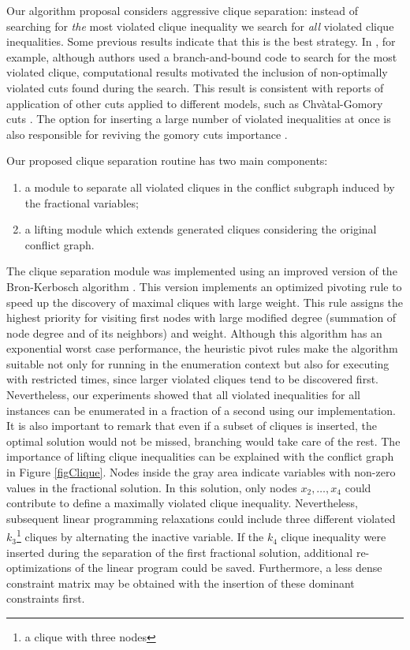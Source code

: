 \documentclass{endm}
\begin{document}
Our algorithm proposal considers aggressive clique separation: instead of searching for \emph{the} most violated clique inequality we search for \emph{all} violated clique inequalities. Some previous results indicate that this is the best strategy. In \cite{Marecek2012}, for example, although authors used a branch-and-bound code to search for the most violated clique, computational results motivated the inclusion of non-optimally violated cuts found during the search. This result is consistent with reports of application of other cuts applied to different models, such as {C}hv\`{a}tal-Gomory cuts \cite{Fischetti2007}. The option for inserting a large number of violated inequalities at once is also responsible for reviving the gomory cuts importance \cite {Cornuejols2007}.

Our proposed clique separation routine has two main components:  \begin{enumerate} \item a module to separate all violated cliques in the conflict subgraph induced by the fractional variables; \item a lifting module which extends generated cliques considering the original conflict graph. \end{enumerate}  The clique separation module was implemented using an improved version of the Bron-Kerbosch algorithm \cite{Bron1973}. This version implements an optimized pivoting rule \cite{Brito2011} to speed up the discovery of maximal cliques with large weight. This rule assigns the highest priority for visiting first nodes with large modified degree (summation of node degree and of its neighbors) and weight. Although this algorithm has an exponential worst case performance, the heuristic pivot rules  make the algorithm suitable not only for running in the enumeration context but also for executing with restricted times, since larger violated cliques tend to be discovered first. Nevertheless, our experiments showed that all violated inequalities for all instances can be enumerated in a fraction of a second using our implementation. It is also important to remark that even if a subset of cliques is inserted, the optimal solution would not be missed, branching would take care of the rest.  The importance of lifting clique inequalities can be explained with the conflict graph in Figure \ref{figClique}. Nodes inside the gray area indicate variables with non-zero values in the fractional solution. In this solution, only nodes $x_{2},\ldots,x_{4}$ could contribute to define a maximally violated clique inequality. Nevertheless, subsequent linear programming relaxations could include three different violated $k_{3}$\footnote{a clique with three nodes} cliques by alternating the inactive variable. If the $k_{4}$ clique inequality were inserted during the separation of the first fractional solution, additional re-optimizations of the linear program could be saved. Furthermore, a less dense constraint matrix may be obtained with the insertion of these dominant constraints first.
\end{document}
